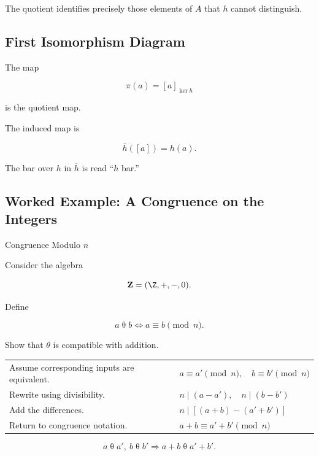 The quotient identifies precisely those elements of \(A\) that \(h\) cannot
distinguish.

\subsection{First Isomorphism Diagram}
\label{subsec:universal-first-isomorphism-diagram}

\begin{center}
\end{center}

The map

\[ \pi(a)=[a]_{\ker h} \]

is the quotient map.

The induced map is

\[ \overline h([a])=h(a). \]

The bar over \(h\) in \(\overline h\) is read ``\(h\) bar.''

\subsection{Worked Example: A Congruence on the Integers}
\label{subsec:worked-congruence-integers}

\begin{workedexamplebox}{Congruence Modulo \(n\)}

Consider the algebra

\[ \mathbf Z=(\Z,+,-,0). \]

Define

\[ a\mathrel{\theta}b
\iff a\equiv b\pmod n. \]

Show that \(\theta\) is compatible with addition.

\begin{tabularx}{\textwidth}{@{}>{\raggedright\arraybackslash}p{}X@{}}
Assume corresponding inputs are equivalent. &
\(a\equiv a'\pmod n,\quad b\equiv b'\pmod n\)\\
Rewrite using divisibility. &
\(n\mid(a-a'),\quad n\mid(b-b')\)\\
Add the differences. &
\(n\mid[(a+b)-(a'+b')]\)\\
Return to congruence notation. &
\(a+b\equiv a'+b'\pmod n\)
\end{tabularx}

\begin{answerbox}
\[ \boxed{a\mathrel{\theta}a',\ b\mathrel{\theta}b'
\Longrightarrow a+b\mathrel{\theta}a'+b'.} \]
\end{answerbox}
\end{workedexamplebox}

